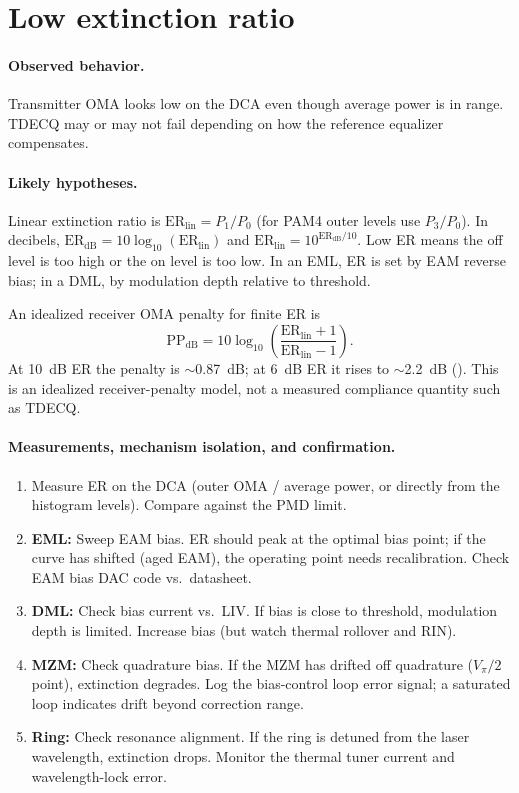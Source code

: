 \section{Low extinction ratio}
\label{sec:fm-low-er}

\paragraph{Observed behavior.}
Transmitter OMA looks low on the DCA even though average power is in range. TDECQ
may or may not fail depending on how the reference equalizer compensates.

\paragraph{Likely hypotheses.}
Linear extinction ratio is $\mathrm{ER}_\mathrm{lin}=P_1/P_0$ (for PAM4 outer
levels use $P_3/P_0$). In decibels,
$\mathrm{ER}_\mathrm{dB}=10\log_{10}(\mathrm{ER}_\mathrm{lin})$ and
$\mathrm{ER}_\mathrm{lin}=10^{\mathrm{ER}_\mathrm{dB}/10}$. Low ER means the
off level is too high or the on level is too low. In an EML, ER is set by EAM
reverse bias; in a DML, by modulation depth relative to threshold.

An idealized receiver OMA penalty for finite ER is
\[
\mathrm{PP}_\mathrm{dB}
=
10\log_{10}\!\left(\frac{\mathrm{ER}_\mathrm{lin}+1}{\mathrm{ER}_\mathrm{lin}-1}\right).
\]
At 10~dB ER the penalty is $\sim$0.87~dB; at 6~dB ER it rises to $\sim$2.2~dB
(). This is an idealized receiver-penalty model, not a
measured compliance quantity such as TDECQ.

\paragraph{Measurements, mechanism isolation, and confirmation.}
\begin{enumerate}
\item Measure ER on the DCA (outer OMA / average power, or directly from the
      histogram levels). Compare against the PMD limit.
\item \textbf{EML:} Sweep EAM bias. ER should peak at the optimal bias point; if
      the curve has shifted (aged EAM), the operating point needs recalibration.
      Check EAM bias DAC code vs.\ datasheet.
\item \textbf{DML:} Check bias current vs.\ LIV. If bias is close to threshold,
      modulation depth is limited. Increase bias (but watch thermal rollover and
      RIN).
\item \textbf{MZM:} Check quadrature bias. If the MZM has drifted off quadrature
      ($V_\pi/2$ point), extinction degrades. Log the bias-control loop error
      signal; a saturated loop indicates drift beyond correction range.
\item \textbf{Ring:} Check resonance alignment. If the ring is detuned from the
      laser wavelength, extinction drops. Monitor the thermal tuner current and
      wavelength-lock error.
\end{enumerate}

